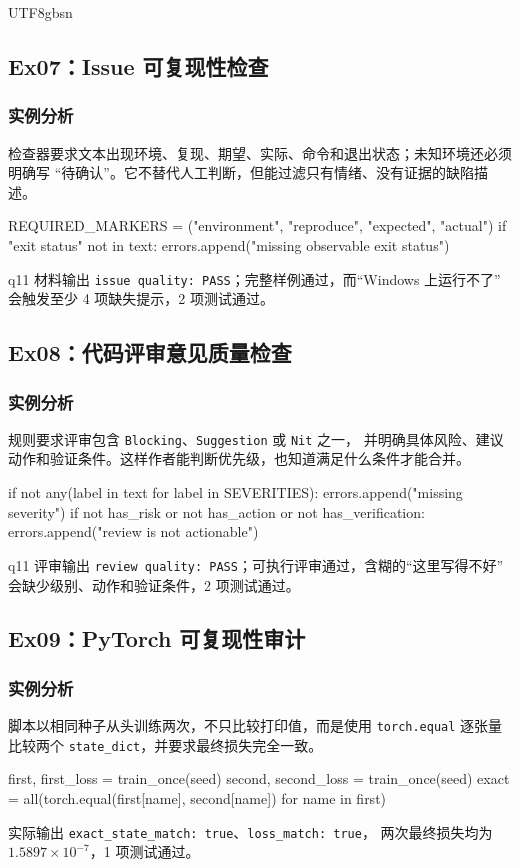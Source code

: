 \documentclass[11pt]{article}
\begin{document}
\begin{CJK*}{UTF8}{gbsn}
\clearpage
\subsection{Ex07：Issue 可复现性检查}
\subsubsection{实例分析}
检查器要求文本出现环境、复现、期望、实际、命令和退出状态；未知环境还必须明确写
“待确认”。它不替代人工判断，但能过滤只有情绪、没有证据的缺陷描述。
\begin{CodeBlock}
REQUIRED_MARKERS = ("environment", "reproduce", "expected", "actual")
if "exit status" not in text:
    errors.append("missing observable exit status")
\end{CodeBlock}
\begin{resultbox}
q11 材料输出 \texttt{issue quality: PASS}；完整样例通过，而“Windows 上运行不了”
会触发至少 4 项缺失提示，2 项测试通过。
\end{resultbox}

\subsection{Ex08：代码评审意见质量检查}
\subsubsection{实例分析}
规则要求评审包含 \texttt{Blocking}、\texttt{Suggestion} 或 \texttt{Nit} 之一，
并明确具体风险、建议动作和验证条件。这样作者能判断优先级，也知道满足什么条件才能合并。
\begin{CodeBlock}
if not any(label in text for label in SEVERITIES):
    errors.append("missing severity")
if not has_risk or not has_action or not has_verification:
    errors.append("review is not actionable")
\end{CodeBlock}
\begin{resultbox}
q11 评审输出 \texttt{review quality: PASS}；可执行评审通过，含糊的“这里写得不好”
会缺少级别、动作和验证条件，2 项测试通过。
\end{resultbox}

\clearpage
\subsection{Ex09：PyTorch 可复现性审计}
\subsubsection{实例分析}
脚本以相同种子从头训练两次，不只比较打印值，而是使用 \texttt{torch.equal}
逐张量比较两个 \texttt{state\_dict}，并要求最终损失完全一致。
\begin{CodeBlock}
first, first_loss = train_once(seed)
second, second_loss = train_once(seed)
exact = all(torch.equal(first[name], second[name]) for name in first)
\end{CodeBlock}
\begin{resultbox}
实际输出 \texttt{exact\_state\_match: true}、\texttt{loss\_match: true}，
两次最终损失均为 $1.5897\times10^{-7}$，1 项测试通过。
\end{resultbox}


\end{CJK*}
\end{document}
